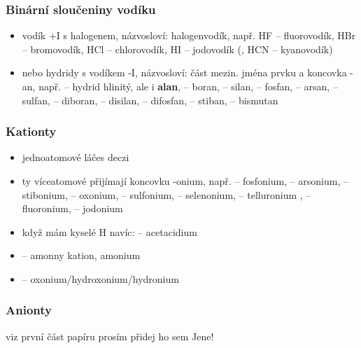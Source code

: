 \documentclass{article}
\begin{document}
\subsubsection{Binární sloučeniny vodíku}
\begin{itemize}
  \item vodík +I s halogenem, názvosloví: halogenvodík, např. HF -- fluorovodík, HBr -- bromovodík, HCl -- chlorovodík, HI -- jodovodík (, HCN -- kyanovodík)
  \item nebo hydridy s vodíkem -I, názvosloví: část mezin. jména prvku a koncovka -an, např.  -- hydrid hlinitý, ale i \textbf{alan},  -- boran,  -- silan,  -- fosfan,  -- arsan,  -- sulfan,  -- diboran,  -- disilan,  -- difosfan,  -- stiban,  -- bismutan
\end{itemize}

\subsubsection{Kationty}
\begin{itemize}
  \item jednoatomové láčes deczi
  \item ty víceatomové přijímají koncovku -onium, např.  -- fosfonium,  -- arsonium,  -- stibonium,  -- oxonium,  -- sulfonium,  -- selenonium,  -- telluronium ,  -- fluoronium,  -- jodonium
  \item když mám kyselé H navíc:  -- acetacidium
  \item {} -- amonny kation, amonium
  \item {} -- oxonium/hydroxonium/hydronium
\end{itemize}

\subsubsection{Anionty}
viz první část papíru prosím přidej ho sem Jene!
\end{document}

